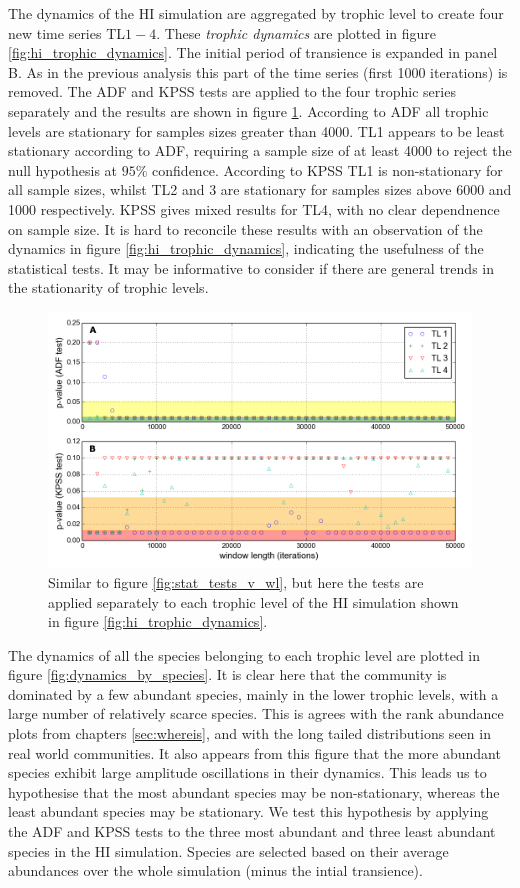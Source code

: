 The dynamics of the HI simulation are aggregated by trophic level to create four new time series TL$1-4$. These \emph{trophic dynamics} are plotted in figure \ref{fig:hi_trophic_dynamics}. The initial period of transience is expanded in panel B. As in the previous analysis this part of the time series (first 1000 iterations) is removed. The ADF and KPSS tests are applied to the four trophic series separately and the results are shown in figure \ref{fig:tl_stat_tests_v_wl}. According to ADF all trophic levels are stationary for samples sizes greater than 4000. TL1 appears to be least stationary according to ADF, requiring a sample size of at least 4000 to reject the null hypothesis at $95\%$ confidence. According to KPSS TL1 is non-stationary for all sample sizes, whilst TL2 and 3 are stationary for samples sizes above 6000 and 1000 respectively. KPSS gives mixed results for TL4, with no clear dependnence on sample size. It is hard to reconcile these results with an observation of the dynamics in figure \ref{fig:hi_trophic_dynamics}, indicating the usefulness of the statistical tests. It may be informative to consider if there are general trends in the stationarity of trophic levels.

\begin{figure}[h!]
	\centering
	\includegraphics[width=0.8\linewidth]{"./chapters/chapter04b/figures/Rtests/tl_stat_tests_v_wl"}
     \caption{Similar to figure \ref{fig:stat_tests_v_wl}, but here the tests are applied separately to each trophic level of the HI simulation shown in figure \ref{fig:hi_trophic_dynamics}.} 
     \label{fig:tl_stat_tests_v_wl}   
\end{figure}

The dynamics of all the species belonging to each trophic level are plotted in figure \ref{fig:dynamics_by_species}. It is clear here that the community is dominated by a few abundant species, mainly in the lower trophic levels, with a large number of relatively scarce species. This is agrees with the rank abundance plots from chapters \ref{sec:whereis}, and with the long tailed distributions seen in real world communities. It also appears from this figure that the more abundant species exhibit large amplitude oscillations in their dynamics. This leads us to hypothesise that the most abundant species may be non-stationary, whereas the least abundant species may be stationary. We test this hypothesis by applying the ADF and KPSS tests to the three most abundant and three least abundant species in the HI simulation. Species are selected based on their average abundances over the whole simulation (minus the intial transience).  

